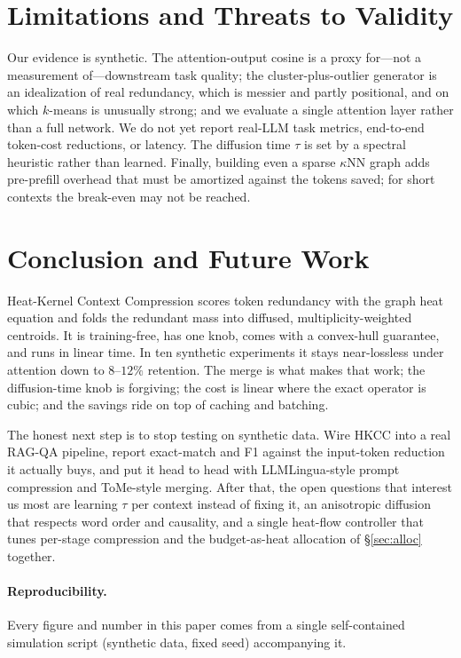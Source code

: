 \documentclass[11pt]{article}
\begin{document}
\section{Limitations and Threats to Validity}
\label{sec:limits}
Our evidence is synthetic. The attention-output cosine is a proxy for---not a measurement
of---downstream task quality; the cluster-plus-outlier generator is an idealization of real
redundancy, which is messier and partly positional, and on which $k$-means is unusually strong; and
we evaluate a single attention layer rather than a full network. We do not yet report real-LLM task
metrics, end-to-end token-cost reductions, or latency. The diffusion time $\tau$ is set by a
spectral heuristic rather than learned. Finally, building even a sparse $\kappa$NN graph adds
pre-prefill overhead that must be amortized against the tokens saved; for short contexts the
break-even may not be reached.

\section{Conclusion and Future Work}
\label{sec:conc}
Heat-Kernel Context Compression scores token redundancy with the graph heat equation and folds
the redundant mass into diffused, multiplicity-weighted centroids. It is training-free, has one
knob, comes with a convex-hull guarantee, and runs in linear time. In ten synthetic experiments it
stays near-lossless under attention down to $8$--$12\%$ retention. The merge is what makes that
work; the diffusion-time knob is forgiving; the cost is linear where the exact operator is cubic;
and the savings ride on top of caching and batching.

The honest next step is to stop testing on synthetic data. Wire HKCC into a real RAG-QA pipeline,
report exact-match and F1 against the input-token reduction it actually buys, and put it head to
head with LLMLingua-style prompt compression and ToMe-style merging. After that, the open questions
that interest us most are learning $\tau$ per context instead of fixing it, an anisotropic diffusion
that respects word order and causality, and a single heat-flow controller that tunes per-stage
compression and the budget-as-heat allocation of \S\ref{sec:alloc} together.

\paragraph{Reproducibility.}
Every figure and number in this paper comes from a single self-contained simulation script
(synthetic data, fixed seed) accompanying it.
\end{document}

